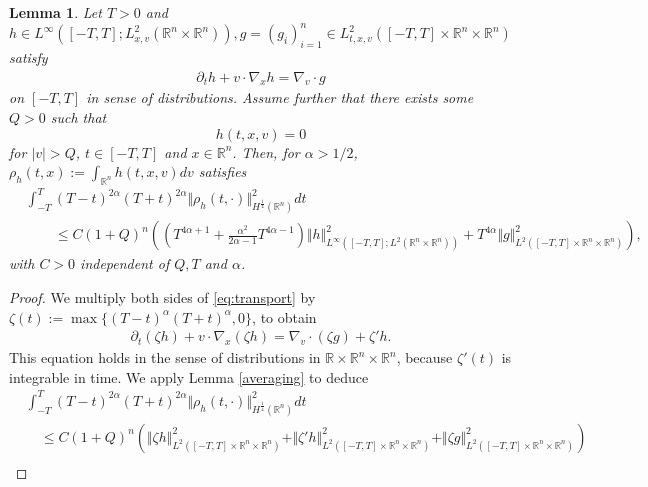 \documentclass[11pt]{amsart}
\newtheorem{lemma}[theorem]{Lemma}
\theoremstyle{definition}
\theoremstyle{remark}
\numberwithin{equation}{section}
\newcommand{\rd}{\partial}
\newcommand{\nb}{\nabla}
\newcommand{\0}{\emptyset}
\newcommand{\alp}{\alpha}
\newcommand{\zt}{\zeta}
\newcommand{\bbR}{\mathbb R}
\begin{document}
	
	{\begin{lemma} \label{lem:averaging-localized}
		Let $T>0$ and $h \in L^{\infty}([-T,T]; L^2_{x,v}(\bbR^n\times\bbR^n) ),  g = ( g_{i} )_{i=1}^{n} \in L^2_{t, x, v}([-T, T]\times\mathbb{R}^n\times\mathbb{R}^n)$  satisfy \begin{equation}\label{eq:transport}
			\begin{split}
				\partial_t h + v\cdot \nabla_x h=  \nb_v \cdot g 
			\end{split}
		\end{equation} on $[-T, T]$ in sense of distributions. Assume further that there exists some $Q>0$ such that $$h(t, x, v)=0$$ for $\vert v\vert>Q$, $t\in [-T, T]$ and $x\in \mathbb{R}^n$. Then, for $\alp>1/2$, $\rho_{h}(t, x):=\int_{\bbR^{n}} h(t, x, v)dv$ satisfies \begin{equation*}
		\begin{split}
			&\int_{-T}^{T} (T-t)^{2\alp}(T+t)^{2\alp} \Vert\rho_{h}(t,\cdot) \Vert^{2}_{ H^\frac{1}{4}(\mathbb{R}^n)} dt \\
			&\qquad \leq C(1+Q)^{n}\left( ( T^{4\alp+1} + \frac{\alp^2}{2\alp-1} T^{4\alp - 1} ) \Vert   h\Vert^2_{L^\infty([-T, T]; L^{2}(\mathbb{R}^n\times\mathbb{R}^n))} + T^{4\alp} \Vert  g \Vert^2_{L^2([-T, T]\times\mathbb{R}^n\times\mathbb{R}^n)} \right),
		\end{split}
		\end{equation*} with $C>0$ independent of $Q, T$ and $\alp$.  
	\end{lemma}
	\begin{proof}
		We multiply both sides of \eqref{eq:transport} by $\zt(t) := \max\{ (T-t)^{\alp}(T+t)^{\alp}, 0\}$, to obtain \begin{equation*}
			\begin{split}
				\rd_t( \zt h ) + v \cdot \nb_{x} (\zt h) = \nb_{v} \cdot (\zt g) + \zt' h. 
			\end{split}
		\end{equation*} This equation holds in the sense of distributions in $\bbR\times\bbR^n\times\bbR^n$, because $\zt'(t)$ is integrable in time. 
		We apply Lemma \ref{averaging} to deduce \begin{equation*}
			\begin{split}
				&\int_{-T}^{T} (T-t)^{2\alp}(T+t)^{2\alp} \Vert\rho_{h}(t,\cdot) \Vert^{2}_{ H^\frac{1}{4}(\mathbb{R}^n)} dt \\
				&\quad \leq C(1+Q)^{n}\left(\Vert \zt  h\Vert^2_{L^2([-T, T]\times\mathbb{R}^n\times\mathbb{R}^n)}+\Vert \zt' h \Vert^2_{L^2([-T, T]\times\mathbb{R}^n\times\mathbb{R}^n)}+ \Vert \zt  g \Vert^2_{L^2([-T, T]\times\mathbb{R}^n\times\mathbb{R}^n)} \right) \\

\end{split}
\end{equation*}
\end{proof}}
\end{document}
